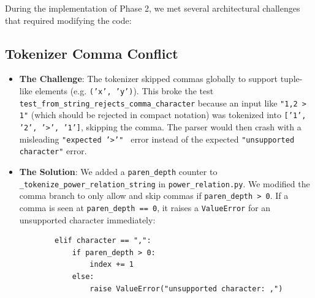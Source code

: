 \documentclass[11pt]{article}
\newcommand{\pathitem}[1]{\texttt{#1}}
\begin{document}
During the implementation of Phase 2, we met several architectural challenges that required modifying the code:

\subsection{Tokenizer Comma Conflict}
\begin{itemize}
  \item \textbf{The Challenge}: The tokenizer skipped commas globally to support tuple-like elements (e.g. \texttt{('x', 'y')}). This broke the test \pathitem{test\_from\_string\_rejects\_comma\_character} because an input like \texttt{"1,2 > 1"} (which should be rejected in compact notation) was tokenized into \texttt{['1', '2', '>', '1']}, skipping the comma. The parser would then crash with a misleading \texttt{"expected '>'" } error instead of the expected \texttt{"unsupported character"} error.
  \item \textbf{The Solution}: We added a \texttt{paren\_depth} counter to \pathitem{\_tokenize\_power\_relation\_string} in \pathitem{power\_relation.py}. We modified the comma branch to only allow and skip commas if \texttt{paren\_depth > 0}. If a comma is seen at \texttt{paren\_depth == 0}, it raises a \pathitem{ValueError} for an unsupported character immediately:
  \begin{verbatim}
        elif character == ",":
            if paren_depth > 0:
                index += 1
            else:
                raise ValueError("unsupported character: ,")
  \end{verbatim}
\end{itemize}
\end{document}
